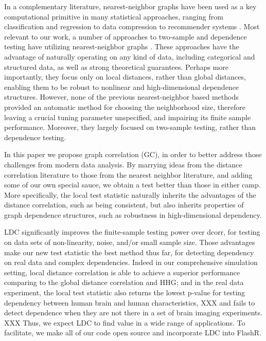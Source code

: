 \documentclass[12pt]{article}
\begin{document}
In a complementary literature, nearest-neighbor graphs have been used as a key computational primitive in many statistical approaches, ranging from classification and regression \cite{Stone1970} to data compression to recommender systems \cite{Sarwar2000}. Most relevant to our work, a number of approaches to two-sample and dependence testing have utilizing nearest-neighbor graphs \cite{David1966,Friedman1983,Schilling1986,Dumcke2014}.  These approaches have the advantage of naturally operating on any kind of data, including categorical and structured data, as well as strong theoretical guarantees.  Perhaps more importantly, they focus only on local distances, rather than global distances, enabling them to be robust to nonlinear and high-dimensional dependence structures.  However, none of the previous nearest-neighbor based methods provided an automatic method for choosing the neighborhood size, therefore leaving a crucial tuning parameter unspecified, and impairing its finite sample performance. Moreover, they largely focused on two-sample testing, rather than dependence testing.  


In this paper we propose graph correlation (GC), in order to better address those challenges from modern data analysis. By marrying ideas from the distance correlation literature to those from the nearest neighbor literature, and adding some of our own special sauce, we obtain a test better than those in either camp.  More specifically,  the local test statistic naturally inherits the advantages of the  distance correlation, such as being consistent, but also inherits properties of graph dependence structures, such as robustness in high-dimensional dependency.  

LDC significantly improves the finite-sample testing power over dcorr, for testing on data sets of non-linearity, noise, and/or small sample size. Those advantages make our new test statistic the best method thus far, for detecting dependency on real data and complex dependencies. Indeed in our comprehensive simulation setting, local distance correlation is able to achieve a superior performance comparing to the global distance correlation and HHG; and in the real data experiment, the local test statistic also returns the lowest p-value for testing dependency between human brain and human characteristics, XXX and fails to detect dependence when they are not there in a set of brain imaging experiments. XXX  Thus, we expect LDC to find value in a wide range of applications.  To facilitate, we make all of our code open source and incorporate LDC into FlashR.
\end{document}
